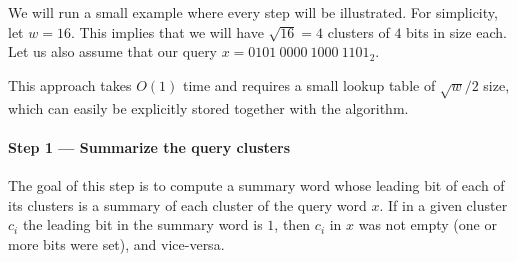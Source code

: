 We will run a small example where every step will be illustrated. For simplicity, let $w=16$. This implies that we will have $\sqrt{16} = 4$ clusters of $4$ bits in size each. Let us also assume that our query $x = 0101\ 0000\ 1000\ 1101_2$.

This approach takes $O(1)$ time and requires a small lookup table of $\sqrt{w}/2$ size, which can easily be explicitly stored together with the algorithm.

\paragraph{Step 1 --- Summarize the query clusters} \label{sec:summaryClusters}

The goal of this step is to compute a summary word whose leading bit of each of its clusters is a summary of each cluster of the query word $x$. If in a given cluster $c_i$ the leading bit in the summary word is $1$, then $c_i$ in $x$ was not empty (one or more bits were set), and vice-versa.

